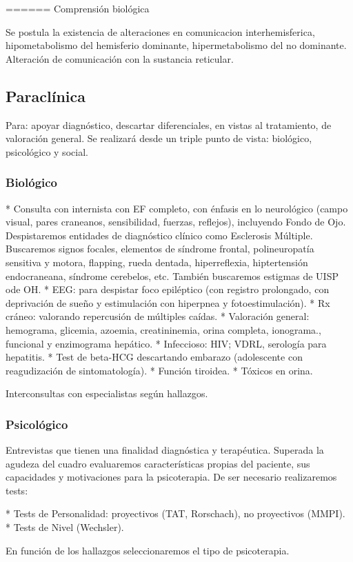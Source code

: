 \documentclass{scrbook}
\begin{document}
====== Comprensión biológica

Se postula la existencia de alteraciones en comunicacion interhemisferica, hipometabolismo del hemisferio dominante, hipermetabolismo del no dominante. Alteración de comunicación con la sustancia reticular.

\subsection*{Paraclínica}
Para: apoyar diagnóstico, descartar diferenciales, en vistas al tratamiento, de valoración general. Se realizará desde un triple punto de vista: biológico, psicológico y social.
\subsubsection*{Biológico}
* Consulta con internista con EF completo, con énfasis en lo neurológico (campo visual, pares craneanos, sensibilidad, fuerzas, reflejos), incluyendo Fondo de Ojo. Despistaremos entidades de diagnóstico clínico como Esclerosis Múltiple. Buscaremos signos focales, elementos de síndrome frontal, polineuropatía sensitiva y motora, flapping, rueda dentada, hiperreflexia, hiptertensión endocraneana, síndrome cerebelos, etc. También buscaremos estigmas de UISP ode OH.
* EEG: para despistar foco epiléptico (con registro prolongado, con deprivación de sueño y estimulación con hiperpnea y fotoestimulación).
* Rx cráneo: valorando repercusión de múltiples caídas.
* Valoración general: hemograma, glicemia, azoemia, creatininemia, orina completa, ionograma., funcional y enzimograma hepático.
* Infeccioso: HIV; VDRL, serología para hepatitis.
* Test de beta-HCG descartando embarazo (adolescente con reagudización de sintomatología).
* Función tiroidea.
* Tóxicos en orina.

Interconsultas con especialistas según hallazgos.
\subsubsection*{Psicológico}
Entrevistas que tienen una finalidad diagnóstica y terapéutica.
Superada la agudeza del cuadro evaluaremos características propias del paciente, sus capacidades y motivaciones para la psicoterapia. De ser necesario realizaremos tests:

* Tests de Personalidad: proyectivos (TAT, Rorschach), no proyectivos (MMPI).
* Tests de Nivel (Wechsler).

En función de los hallazgos seleccionaremos el tipo de psicoterapia.
\end{document}
